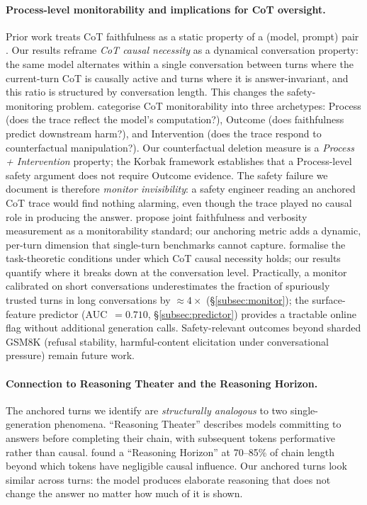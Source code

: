 \documentclass{article}
\begin{document}
\paragraph{Process-level monitorability and implications for CoT oversight.}
Prior work treats CoT faithfulness as a static property of a
(model, prompt) pair \citep{lanham2023, arcuschin2025}.
Our results reframe \emph{CoT causal necessity} as a dynamical
conversation property: the same model alternates within a single
conversation between turns where the current-turn CoT is causally
active and turns where it is answer-invariant, and this ratio is
structured by conversation length.
This changes the safety-monitoring problem.
\citet{korbak2025} categorise CoT monitorability into three
archetypes: Process (does the trace reflect the model's computation?),
Outcome (does faithfulness predict downstream harm?), and Intervention
(does the trace respond to counterfactual manipulation?).
Our counterfactual deletion measure is a \emph{Process + Intervention}
property; the Korbak framework establishes that a Process-level safety
argument does not require Outcome evidence.
The safety failure we document is therefore \emph{monitor invisibility}:
a safety engineer reading an anchored CoT trace would find nothing
alarming, even though the trace played no causal role in producing
the answer.
\citet{meek2025} propose joint faithfulness and verbosity measurement
as a monitorability standard; our anchoring metric adds a dynamic,
per-turn dimension that single-turn benchmarks cannot capture.
\citet{cot_necessity2025} formalise the task-theoretic conditions
under which CoT causal necessity holds; our results quantify where
it breaks down at the conversation level.
Practically, a monitor calibrated on short conversations
underestimates the fraction of spuriously trusted turns in long
conversations by ${\approx}4\times$ (\S\ref{subsec:monitor});
the surface-feature predictor (AUC~$=0.710$, \S\ref{subsec:predictor})
provides a tractable online flag without additional generation calls.
Safety-relevant outcomes beyond sharded GSM8K (refusal stability,
harmful-content elicitation under conversational pressure) remain
future work.

\paragraph{Connection to Reasoning Theater and the Reasoning Horizon.}
The anchored turns we identify are \emph{structurally analogous}
to two single-generation phenomena.
``Reasoning Theater'' \citep{reasoning_theater2026} describes
models committing to answers before completing their chain, with
subsequent tokens performative rather than causal.
\citet{mechanistic_faithfulness2026} found a ``Reasoning Horizon''
at 70--85\% of chain length beyond which tokens have negligible
causal influence.
Our anchored turns look similar across turns: the model produces
elaborate reasoning that does not change the answer no matter
how much of it is shown.
\end{document}
